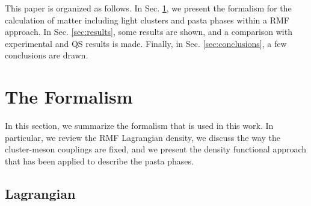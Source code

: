 \documentclass[aps,prc,nofootinbib,twocolumn,showpacs]{revtex4-1}
\begin{document}
This paper is organized as follows. In Sec. \ref{sec:form}, we
  present the formalism for the calculation of matter including light clusters 
and pasta phases within a RMF approach. In Sec. \ref{sec:results}, 
some results are shown, and a comparison with experimental and QS results is made. 
Finally, in Sec. \ref{sec:conclusions}, a few conclusions are drawn.



\section{The Formalism} \label{sec:form}

In this section, we summarize the formalism that is used in this work. In particular, we review the RMF Lagrangian density, we discuss the way the cluster-meson couplings are fixed, and we present the density functional approach that has been applied to describe the pasta phases.

\subsection{Lagrangian}
\end{document}
